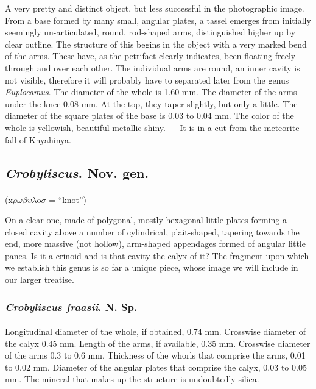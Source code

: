 \documentclass[a4paper, 12pt, oneside]{article}
\begin{document}
A very pretty and distinct object, but less successful in the photographic image. From a base formed by many small, angular plates, a tassel emerges from initially seemingly un-articulated, round, rod-shaped arms, distinguished higher up by clear outline. The structure of this begins in the object with a very marked bend of the arms. These have, as the petrifact clearly indicates, been floating freely through and over each other. The individual arms are round, an inner cavity is not visible, therefore it will probably have to separated later from the genus \emph{Euplocamus}. The diameter of the whole is 1.60 mm. The diameter of the arms under the knee 0.08 mm. At the top, they taper slightly, but only a little. The diameter of the square plates of the base is 0.03 to 0.04 mm. The color of the whole is yellowish, beautiful metallic shiny. --- It is in a cut from the meteorite fall of Knyahinya.
\subsection{\emph{Crobyliscus}. Nov. gen.}
\paragraph{}
(x$\rho\omega\beta\upsilon\lambda$o$\sigma$ = ``knot'')%

On a clear one, made of polygonal, mostly hexagonal little plates forming a closed cavity above a number of cylindrical, plait-shaped, tapering towards the end, more massive (not hollow), arm-shaped appendages formed of angular little panes. Is it a crinoid and is that cavity the calyx of it? The fragment upon which we establish this genus is so far a unique piece, whose image we will include in our larger treatise.
\subsubsection{\emph{Crobyliscus fraasii}. N. Sp.}
\paragraph{}
Longitudinal diameter of the whole, if obtained, 0.74 mm. Crosswise diameter of the calyx 0.45 mm. Length of the arms, if available, 0.35 mm. Crosswise diameter of the arms 0.3 to 0.6 mm. Thickness of the whorls that comprise the arms, 0.01 to 0.02 mm. Diameter of the angular plates that comprise the calyx, 0.03 to 0.05 mm. The mineral that makes up the structure is undoubtedly silica.
\end{document}
